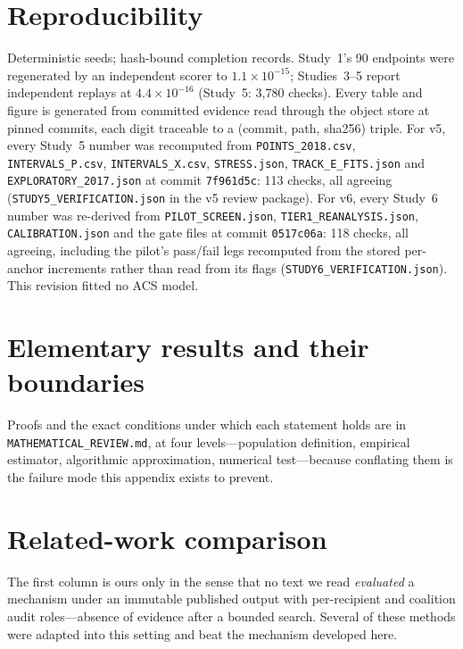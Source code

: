 \documentclass[10pt]{article}
\begin{document}
\section{Reproducibility}

Deterministic seeds; hash-bound completion records. Study~1's 90 endpoints were regenerated by an independent
scorer to $1.1\times10^{-15}$; Studies~3--5 report independent replays at $4.4\times10^{-16}$ (Study~5: 3{,}780
checks). Every table and figure is generated from committed evidence read through the object store at pinned
commits, each digit traceable to a (commit, path, sha256) triple. For v5, every Study~5 number was recomputed
from \texttt{POINTS\_2018.csv}, \texttt{INTERVALS\_P.csv}, \texttt{INTERVALS\_X.csv}, \texttt{STRESS.json},
\texttt{TRACK\_E\_FITS.json} and \texttt{EXPLORATORY\_2017.json} at commit \texttt{7f961d5c}: 113 checks, all
agreeing (\texttt{STUDY5\_VERIFICATION.json} in the v5 review package). For v6, every Study~6 number was
re-derived from \texttt{PILOT\_SCREEN.json}, \texttt{TIER1\_REANALYSIS.json}, \texttt{CALIBRATION.json} and the
gate files at commit \texttt{0517c06a}: 118 checks, all agreeing, including the pilot's pass/fail legs
recomputed from the stored per-anchor increments rather than read from its flags
(\texttt{STUDY6\_VERIFICATION.json}). This revision fitted no ACS model.

\appendix
\clearpage

\section{Elementary results and their boundaries}
\label{app:math}
\noindent Proofs and the exact conditions under which each statement holds are in
\texttt{MATHEMATICAL\_REVIEW.md}, at four levels---population definition, empirical estimator, algorithmic
approximation, numerical test---because conflating them is the failure mode this appendix exists to prevent.

\section{Related-work comparison}
\label{app:related}
\begin{table}[H]
\centering\small

\caption{The five features this paper's setting turns on. \noteRelatedWork}
\label{tab:related}
\end{table}
\noindent The first column is ours only in the sense that no text we read \emph{evaluated} a mechanism under an
immutable published output with per-recipient and coalition audit roles---absence of evidence after a bounded
search. Several of these methods were adapted into this setting and beat the mechanism developed here.
\end{document}
